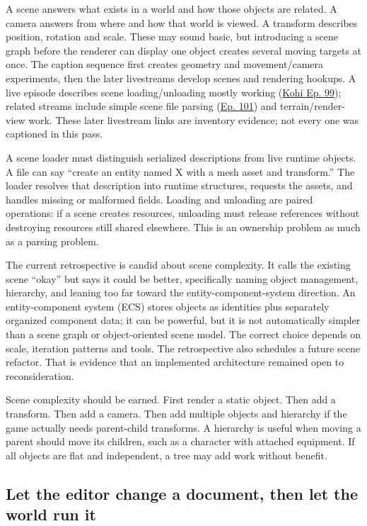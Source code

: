 A scene answers what exists in a world and how those objects are related. A camera answers from where and how that world is viewed. A transform describes position, rotation and scale. These may sound basic, but introducing a scene graph before the renderer can display one object creates several moving targets at once. The caption sequence first creates geometry and movement/camera experiments, then the later livestreams develop scenes and rendering hookups. A live episode describes scene loading/unloading mostly working (\href{https://www.youtube.com/watch?v=N7sc-i-wryw}{Kohi Ep. 99}); related streams include simple scene file parsing (\href{https://www.youtube.com/watch?v=q8AfndGO-Ms}{Ep. 101}) and terrain/render-view work. These later livestream links are inventory evidence; not every one was captioned in this pass.

A scene loader must distinguish serialized descriptions from live runtime objects. A file can say ``create an entity named X with a mesh asset and transform.'' The loader resolves that description into runtime structures, requests the assets, and handles missing or malformed fields. Loading and unloading are paired operations: if a scene creates resources, unloading must release references without destroying resources still shared elsewhere. This is an ownership problem as much as a parsing problem.

The current retrospective is candid about scene complexity. It calls the existing scene ``okay'' but says it could be better, specifically naming object management, hierarchy, and leaning too far toward the entity-component-system direction. An entity-component system (ECS) stores objects as identities plus separately organized component data; it can be powerful, but it is not automatically simpler than a scene graph or object-oriented scene model. The correct choice depends on scale, iteration patterns and tools. The retrospective also schedules a future scene refactor. That is evidence that an implemented architecture remained open to reconsideration.

Scene complexity should be earned. First render a static object. Then add a transform. Then add a camera. Then add multiple objects and hierarchy if the game actually needs parent-child transforms. A hierarchy is useful when moving a parent should move its children, such as a character with attached equipment. If all objects are flat and independent, a tree may add work without benefit.

\subsection{Let the editor change a document, then let the world run it}\label{06-engine-ii-ch032-let-the-editor-change-a-document-then-let-the-world-run-it}

